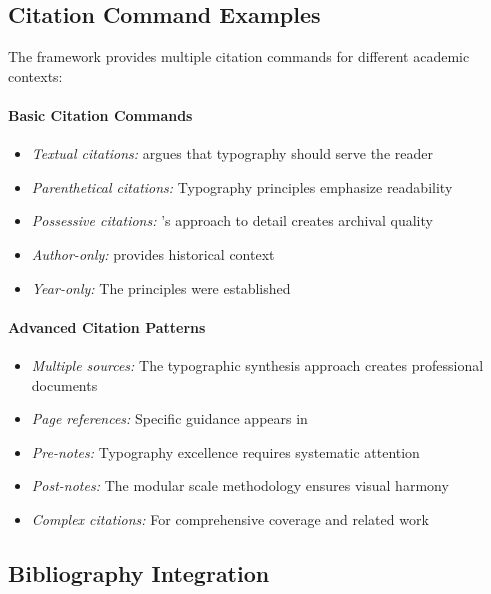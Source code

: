 \documentclass[11pt]{article}
\begin{document}
\subsection{Citation Command Examples}

The framework provides multiple citation commands for different academic contexts:

\paragraph{Basic Citation Commands}
\begin{itemize}
\item \emph{Textual citations:} \textcite{butterick2019practical} argues that typography should serve the reader
\item \emph{Parenthetical citations:} Typography principles emphasize readability \parencite{brown2018flexible}
\item \emph{Possessive citations:} \citeauthor{hochuli1987detail}'s approach to detail creates archival quality
\item \emph{Author-only:} \textcite{bringhurst2012elements} provides historical context
\item \emph{Year-only:} The principles were established \parencite*{hochuli1987detail}
\end{itemize}

\paragraph{Advanced Citation Patterns}
\begin{itemize}
\item \emph{Multiple sources:} The typographic synthesis approach \parencite{butterick2019practical,brown2018flexible,hochuli1987detail} creates professional documents
\item \emph{Page references:} Specific guidance appears in \textcite{butterick2019practical}
\item \emph{Pre-notes:} Typography excellence requires systematic attention \parencite{hochuli1987detail}
\item \emph{Post-notes:} The modular scale methodology \parencite{brown2018flexible} ensures visual harmony
\item \emph{Complex citations:} For comprehensive coverage \parencite{butterick2019practical} and related work \parencite{bringhurst2012elements}
\end{itemize}

\subsection{Bibliography Integration}
\end{document}
